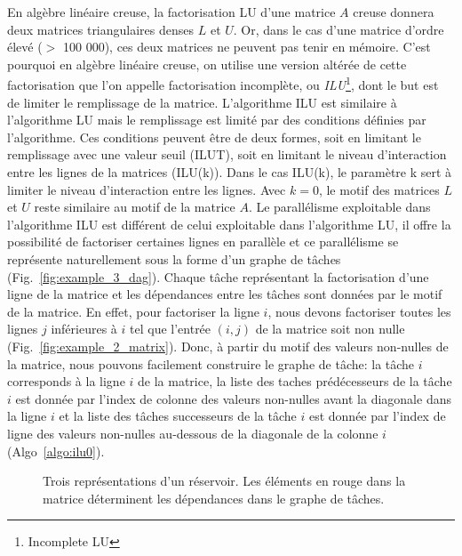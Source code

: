 En algèbre linéaire creuse, la factorisation LU d'une matrice $A$ creuse donnera deux matrices triangulaires denses $L$ et $U$.
%
Or, dans le cas d'une matrice d'ordre élevé ($>$ 100 000), ces deux matrices ne peuvent pas tenir en mémoire.
%
C'est pourquoi en algèbre linéaire creuse, on utilise une version altérée de cette factorisation que l'on appelle factorisation incomplète, ou {\em ILU}\footnote{Incomplete LU}, dont le but est de limiter le remplissage de la matrice.
%
L'algorithme ILU est similaire à l'algorithme LU mais le remplissage est limité par des conditions définies par l'algorithme.
%
Ces conditions peuvent être de deux formes, soit en limitant le remplissage avec une valeur seuil (ILUT), soit en limitant le niveau d'interaction entre les lignes de la matrices (ILU(k)).
%
Dans le cas ILU(k), le paramètre k sert à limiter le niveau d'interaction entre les lignes.
%
Avec $k=0$, le motif des matrices $L$ et $U$ reste similaire au motif de la matrice $A$.
%
Le parallélisme exploitable dans l'algorithme ILU est différent de celui exploitable dans l'algorithme LU, il offre la possibilité de factoriser certaines lignes en parallèle et ce parallélisme se représente naturellement sous la forme d'un graphe de tâches (Fig.~\ref{fig:example_3_dag}).
%
Chaque tâche représentant la factorisation d'une ligne de la matrice et les dépendances entre les tâches sont données par le motif de la matrice.
%
En effet, pour factoriser la ligne $i$, nous devons factoriser toutes les lignes $j$ inférieures à $i$ tel que l'entrée $(i,j)$ de la matrice soit non nulle (Fig.~\ref{fig:example_2_matrix}).
%
Donc, à partir du motif des valeurs non-nulles de la matrice, nous pouvons facilement construire le graphe de tâche:
%
la tâche $i$ corresponds à la ligne $i$ de la matrice, la liste des taches prédécesseurs de la tâche $i$ est donnée par l'index de colonne des valeurs non-nulles avant la diagonale dans la ligne $i$ et la liste des tâches successeurs de la tâche $i$ est donnée par l'index de ligne des valeurs non-nulles au-dessous de la diagonale de la colonne $i$ (Algo~\ref{algo:ilu0}).

\begin{figure}[!ht]
     \begin{center}
    \end{center}
    \caption{Trois représentations d'un réservoir. Les éléments en rouge dans la matrice déterminent les dépendances dans le graphe de tâches.}
    \label{fig:exemple_3_dag}
\end{figure}

